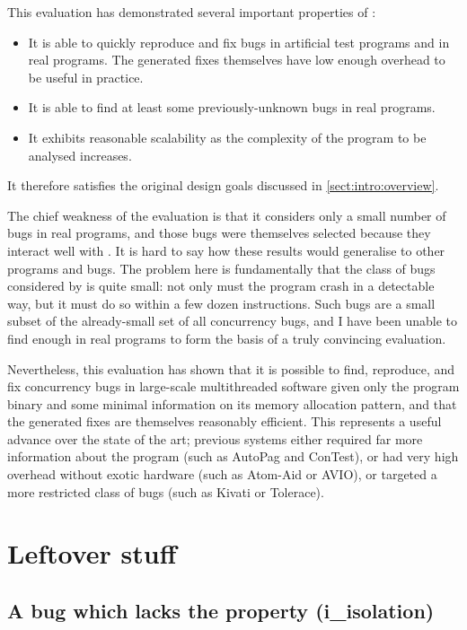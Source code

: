 This evaluation has demonstrated several important properties of
{\technique}:
\begin{itemize}
\item It is able to quickly reproduce and fix bugs in artificial test
  programs and in real programs.  The generated fixes themselves have
  low enough overhead to be useful in practice.
\item It is able to find at least some previously-unknown bugs in real
  programs.
\item It exhibits reasonable scalability as the complexity of the
  program to be analysed increases.
\end{itemize}
It therefore satisfies the original design goals discussed in
\autoref{sect:intro:overview}.

The chief weakness of the evaluation is that it considers only a small
number of bugs in real programs, and those bugs were themselves
selected because they interact well with {\technique}.  It is hard to
say how these results would generalise to other programs and bugs.
The problem here is fundamentally that the class of bugs considered by
{\technique} is quite small: not only must the program crash in a
detectable way, but it must do so within a few dozen instructions.
Such bugs are a small subset of the already-small set of all
concurrency bugs, and I have been unable to find enough in real
programs to form the basis of a truly convincing evaluation.

Nevertheless, this evaluation has shown that it is possible to find,
reproduce, and fix concurrency bugs in large-scale multithreaded
software given only the program binary and some minimal information on
its memory allocation pattern, and that the generated fixes are
themselves reasonably efficient.  This represents a useful advance
over the state of the art; previous systems either required far more
information about the program (such as AutoPag\needCite{} and
ConTest\needCite{}), or had very high overhead without exotic hardware
(such as Atom-Aid\needCite{} or AVIO\needCite{}), or targeted a more
restricted class of bugs (such as Kivati\needCite{} or
Tolerace\needCite{}).

\section{Leftover stuff}

\subsection{A bug which lacks the  property (i\_isolation)}

